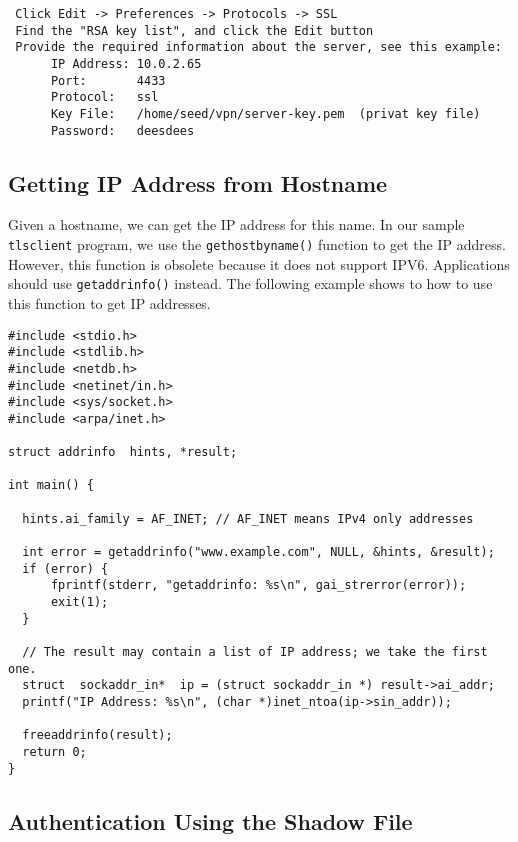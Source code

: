 \begin{lstlisting}
 Click Edit -> Preferences -> Protocols -> SSL 
 Find the "RSA key list", and click the Edit button
 Provide the required information about the server, see this example:
      IP Address: 10.0.2.65
      Port:       4433
      Protocol:   ssl
      Key File:   /home/seed/vpn/server-key.pem  (privat key file)
      Password:   deesdees
\end{lstlisting}


\subsection{Getting IP Address from Hostname}
\label{vpn:subsec:hostnametoip}


Given a hostname, we can get the IP address for this name. 
In our sample \texttt{tlsclient} program, we use
the \texttt{gethostbyname()} function to get the IP address. However, this
function is obsolete because it does not support IPV6. 
Applications should use \texttt{getaddrinfo()} instead. The following 
example shows to how to use this function to get IP addresses. 


\begin{lstlisting}
#include <stdio.h>
#include <stdlib.h>
#include <netdb.h>
#include <netinet/in.h>
#include <sys/socket.h>
#include <arpa/inet.h>

struct addrinfo  hints, *result;

int main() {

  hints.ai_family = AF_INET; // AF_INET means IPv4 only addresses

  int error = getaddrinfo("www.example.com", NULL, &hints, &result);
  if (error) {
      fprintf(stderr, "getaddrinfo: %s\n", gai_strerror(error));
      exit(1);
  }

  // The result may contain a list of IP address; we take the first one.
  struct  sockaddr_in*  ip = (struct sockaddr_in *) result->ai_addr;
  printf("IP Address: %s\n", (char *)inet_ntoa(ip->sin_addr));

  freeaddrinfo(result);
  return 0;
}
\end{lstlisting}
 


\subsection{Authentication Using the Shadow File}
\label{vpn:subsec:auth}


